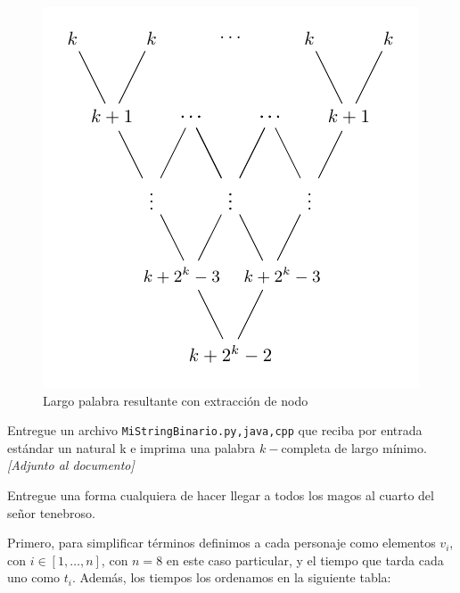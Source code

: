 \documentclass[letterpaper,10pt,table, dvipsnames]{article}
\begin{document}
\begin{figure}[h]
  \centering
  \includegraphics[scale=.8]{examples/tree_ex3.pdf}
  \caption{Largo palabra resultante con extracción de nodo}\label{fig:resuk1}
\end{figure}

\begin{tcolorbox}
 Entregue un archivo \texttt{MiStringBinario.{py,java,cpp}} que reciba por entrada estándar un natural k e imprima una palabra $k-$completa de largo mínimo. \textit{[Adjunto al documento]}
\end{tcolorbox}



\newpage

\begin{tcolorbox}
 Entregue una forma cualquiera de hacer llegar a todos los magos al cuarto del señor tenebroso.
\end{tcolorbox}

Primero, para simplificar términos definimos a cada personaje como elementos $v_{i}$, con $i\in[1,\ldots,n]$, con $n=8$ en este caso particular, y el tiempo que tarda cada uno como $t_i$. Además, los tiempos los ordenamos en la siguiente tabla:
\end{document}
